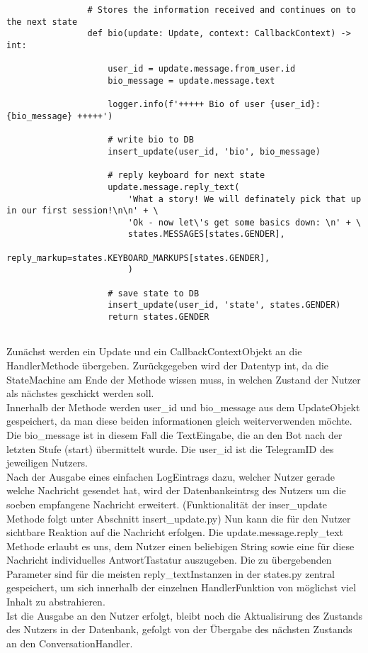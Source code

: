                 \begin{verbatim}
                # Stores the information received and continues on to the next state
                def bio(update: Update, context: CallbackContext) -> int:
                    
                    user_id = update.message.from_user.id
                    bio_message = update.message.text
                    
                    logger.info(f'+++++ Bio of user {user_id}: {bio_message} +++++')

                    # write bio to DB
                    insert_update(user_id, 'bio', bio_message)

                    # reply keyboard for next state
                    update.message.reply_text(
                        'What a story! We will definately pick that up in our first session!\n\n' + \
                        'Ok - now let\'s get some basics down: \n' + \
                        states.MESSAGES[states.GENDER],
                        reply_markup=states.KEYBOARD_MARKUPS[states.GENDER],
                        )

                    # save state to DB
                    insert_update(user_id, 'state', states.GENDER)
                    return states.GENDER
                
                \end{verbatim} 

                Zunächst werden ein Update\- und ein CallbackContext\-Objekt an die Handler\-Methode übergeben. Zurückgegeben wird der Datentyp int, da die State\-Machine am Ende der Methode wissen muss, in welchen Zustand der Nutzer als nächstes geschickt werden soll. \\
                Innerhalb der Methode werden user\_id und bio\_message aus dem Update\-Objekt gespeichert, da man diese beiden informationen gleich weiterverwenden möchte. Die bio\_message ist in diesem Fall die Text\-Eingabe, die an den Bot nach der letzten Stufe (start) übermittelt wurde. Die user\_id ist die Telegram\-ID des jeweiligen Nutzers. \\
                Nach der Ausgabe eines einfachen Log\-Eintrags dazu, welcher Nutzer gerade welche Nachricht gesendet hat, wird der Datenbankeintrsg des Nutzers um die soeben empfangene Nachricht erweitert. (Funktionalität der inser\_update Methode folgt unter Abschnitt insert\_update.py)
                Nun kann die für den Nutzer sichtbare Reaktion auf die Nachricht erfolgen. Die update.message.reply\_text Methode erlaubt es uns, dem Nutzer einen beliebigen String sowie eine für diese Nachricht individuelles Antwort\-Tastatur auszugeben. Die zu übergebenden Parameter sind für die meisten reply\_text\-Instanzen in der states.py zentral gespeichert, um sich innerhalb der einzelnen Handler\-Funktion von möglichst viel Inhalt zu abstrahieren.\\
                Ist die Ausgabe an den Nutzer erfolgt, bleibt noch die Aktualisirung des Zustands des Nutzers in der Datenbank, gefolgt von der Übergabe des nächsten Zustands an den ConversationHandler.

